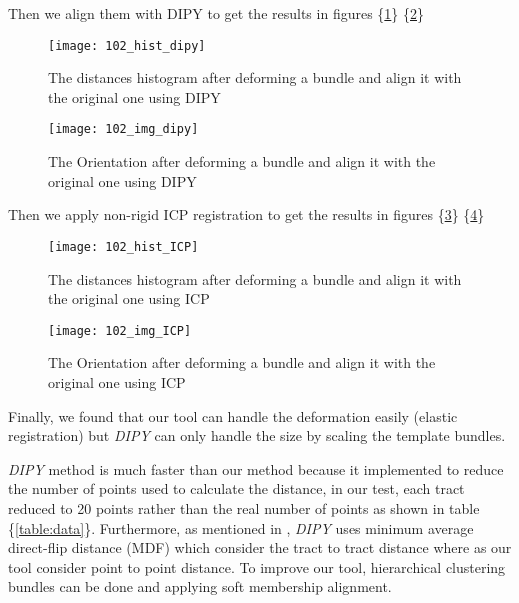 \documentclass[../structure.tex]{subfiles}
\begin{document}
Then we align them with DIPY to get the results in figures \{\ref{fig:hist_dipy_def}\} \{\ref{fig:img_dipy_def}\}

\begin{figure}[h!]
\centering
\texttt{[image: 102\_hist\_dipy]}
\captionsetup{justification=centering}
\caption{The distances histogram after deforming a bundle and align it with the original one using DIPY}
\label{fig:hist_dipy_def}
\end{figure}

\begin{figure}[h!]
\centering
\texttt{[image: 102\_img\_dipy]}
\captionsetup{justification=centering}
\caption{The Orientation after deforming a bundle and align it with the original one using DIPY}
\label{fig:img_dipy_def}
\end{figure}
\pagebreak
Then we apply non-rigid ICP registration to get the results in figures \{\ref{fig:hist_icp_def}\} \{\ref{fig:img_icp_def}\}

\begin{figure}[h!]
\centering
\texttt{[image: 102\_hist\_ICP]}
\captionsetup{justification=centering}
\caption{The distances histogram after deforming a bundle and align it with the original one using ICP}
\label{fig:hist_icp_def}
\end{figure}

\begin{figure}[h!]
\centering
\texttt{[image: 102\_img\_ICP]}
\captionsetup{justification=centering}
\caption{The Orientation after deforming a bundle and align it with the original one using ICP}
\label{fig:img_icp_def}
\end{figure}

Finally, we found that our tool can handle the deformation easily (elastic registration) but \textit{DIPY} can only handle the size by scaling the template bundles.

\textit{DIPY} method is much faster than our method because it implemented to reduce the number of points used to calculate the distance, in our test, each tract reduced to 20 points rather than the real number of points as shown in table \{\ref{table:data}\}. Furthermore, as mentioned in \cite{ODonnell2012}, \textit{DIPY} uses minimum average direct-flip distance (MDF) which consider the tract to tract distance where as our tool consider point to point distance. To improve our tool, hierarchical clustering bundles can be done and applying soft membership alignment.
\end{document}
